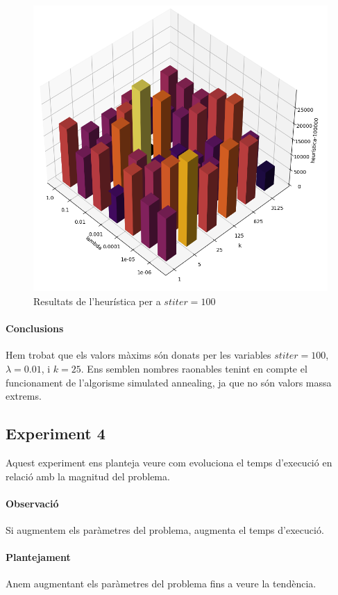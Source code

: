\documentclass[a4paper]{article}
\begin{document}
\begin{figure}[htp]
\centering
\includegraphics[scale=0.45]{images/experiment3.png}
\caption{Resultats de l'heurística per a $stiter=100$}
\centering
\end{figure}

\paragraph{Conclusions} Hem trobat que els valors màxims són donats per les variables $stiter=100$, $\lambda = 0.01$, i $k = 25$. Ens semblen nombres raonables tenint en compte el funcionament de l'algorisme simulated annealing, ja que no són valors massa extrems.

\newpage

\subsection{Experiment 4}
Aquest experiment ens planteja veure com evoluciona el temps d'execució en relació amb la magnitud del problema.
\paragraph{Observació} Si augmentem els paràmetres del problema, augmenta el temps d'execució.
\paragraph{Plantejament} Anem augmentant els paràmetres del problema fins a veure la tendència.
\end{document}
